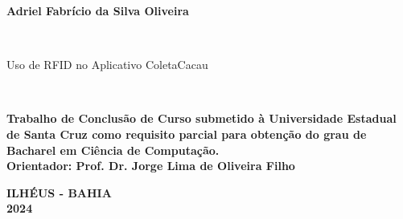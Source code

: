
\begin{center}

    {\large \begin{large} \bfseries Adriel Fabrício da Silva Oliveira \end{large}\\}
    \vspace{8cm}
    {\large\bfseries{\begin{large}Uso de RFID no Aplicativo ColetaCacau \end{large}}\\}
    \vspace{1cm}
    \hspace{.45\linewidth}
    \begin{minipage}{.50\linewidth}
            \textbf{Trabalho de Conclusão de Curso submetido à Universidade Estadual de Santa Cruz como requisito parcial 
            para obtenção do grau de Bacharel em Ciência de Computação. }
            \textbf{\\ Orientador: Prof. Dr. Jorge Lima de Oliveira Filho\\}
    \end{minipage}

    \vspace{2cm}
    \vfill
    {\large\bfseries{ ILHÉUS - BAHIA \\ 2024}}
\end{center}

